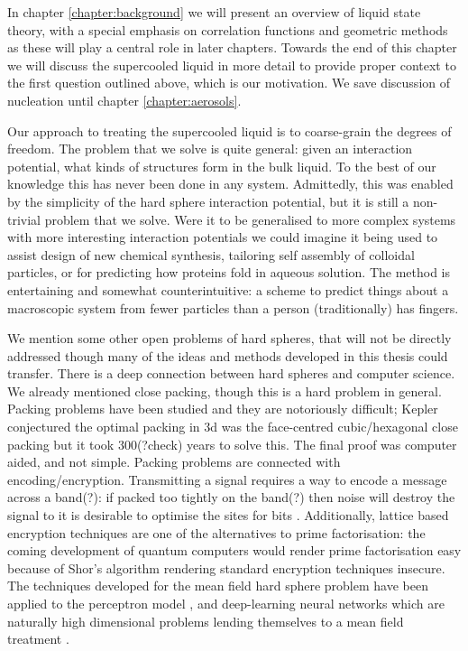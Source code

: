 \documentclass[11pt,twoside]{report}
\begin{document}
In chapter \ref{chapter:background} we will present an overview of liquid state theory, with a special emphasis on correlation functions and geometric methods as these will play a central role in later chapters.
Towards the end of this chapter we will discuss the supercooled liquid in more detail to provide proper context to the first question outlined above, which is our motivation.
We save discussion of nucleation until chapter \ref{chapter:aerosols}.

Our approach to treating the supercooled liquid is to coarse-grain the degrees of freedom.
The problem that we solve is quite general: given an interaction potential, what kinds of structures form in the bulk liquid.
To the best of our knowledge this has never been done in any system.
Admittedly, this was enabled by the simplicity of the hard sphere interaction potential, but it is still a non-trivial problem that we solve.
Were it to be generalised to more complex systems with more interesting interaction potentials we could imagine it being used to assist design of new chemical synthesis, tailoring self assembly of colloidal particles, or for predicting how proteins fold in aqueous solution.
The method is entertaining and somewhat counterintuitive: a scheme to predict things about a macroscopic system from fewer particles than a person (traditionally) has fingers.

We mention some other open problems of hard spheres, that will not be directly addressed though many of the ideas and methods developed in this thesis could transfer.
There is a deep connection between hard spheres and computer science.
We already mentioned close packing, though this is a hard problem in general.
Packing problems have been studied \cite{Cohn2016,Conway1999} and they are notoriously difficult; Kepler conjectured the optimal packing in 3d was the face-centred cubic/hexagonal close packing but it took 300(?check) years to solve this.
The final proof was computer aided, and not simple.
Packing problems are connected with encoding/encryption.
Transmitting a signal requires a way to encode a message across a band(?): if packed too tightly on the band(?) then noise will destroy the signal to it is desirable to optimise the sites for bits \cite{Cohn,?,?}.
Additionally, lattice based encryption techniques are one of the alternatives to prime factorisation: the coming development of quantum computers \cite{?,?} would render prime factorisation easy because of Shor's algorithm \cite{Shor?} rendering standard encryption techniques insecure.
The techniques developed for the mean field hard sphere problem have been applied to the perceptron model \cite{?}, and deep-learning neural networks which are naturally high dimensional problems lending themselves to a mean field treatment \cite{?}.
\end{document}
